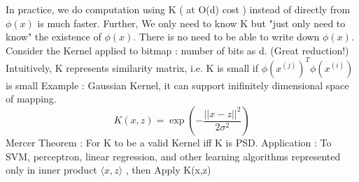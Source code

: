 \documentclass{article}
\begin{document}
In practice, we do computation using K ( at O(d) cost ) instead of directly from \(\phi(x)\) is much faster. Further, We only need to know K but "just only need to know" the existence of \(\phi(x)\). There is no need to be able to write down \(\phi(x)\). Consider the Kernel applied to bitmap : number of bits as d. (Great reduction!)
\newline  
Intuitively, K represents similarity matrix, i.e. K is small if \( \phi(x^{(j)})^T \phi(x^{(i)})\) is small
\newline
Example : Gaussian Kernel, it can support inifinitely dimensional space of mapping.
\[K(x, z) = \exp\left(-\frac{||x - z||^2}{2\sigma^2}\right)\]
\newline 
Mercer Theorem : For K to be a valid Kernel iff K is PSD.
\newline 
Application : To SVM, perceptron, linear regression, and other learning algorithms represented only in inner product \(\langle x,z\rangle\) , then Apply K(x,z)  

 
\end{document}
